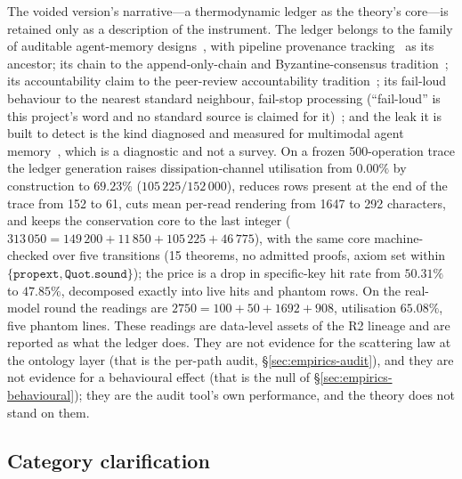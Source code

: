 \documentclass[11pt,a4paper]{article}
\begin{document}
The voided version's narrative---a thermodynamic ledger as the theory's core---is retained only as a description of the instrument. The ledger belongs to the family of auditable agent-memory designs~\cite{nian2026,ledger2026,echo2026,dieudonne2026,he2026beyond,he2026cognitive}, with pipeline provenance tracking~\cite{grafberger2023} as its ancestor; its chain to the append-only-chain and Byzantine-consensus tradition~\cite{garay2015,castro1999}; its accountability claim to the peer-review accountability tradition~\cite{haeberlen2007}; its fail-loud behaviour to the nearest standard neighbour, fail-stop processing (``fail-loud'' is this project's word and no standard source is claimed for it)~\cite{schneider1984}; and the leak it is built to detect is the kind diagnosed and measured for multimodal agent memory~\cite{memleak2026}, which is a diagnostic and not a survey. On a frozen 500-operation trace the ledger generation raises dissipation-channel utilisation from $0.00\%$ by construction to $69.23\%$ ($105\,225/152\,000$), reduces rows present at the end of the trace from 152 to 61, cuts mean per-read rendering from 1647 to 292 characters, and keeps the conservation core to the last integer ($313\,050 = 149\,200 + 11\,850 + 105\,225 + 46\,775$), with the same core machine-checked over five transitions (15 theorems, no admitted proofs, axiom set within $\{\texttt{propext}, \texttt{Quot.sound}\}$); the price is a drop in specific-key hit rate from $50.31\%$ to $47.85\%$, decomposed exactly into live hits and phantom rows. On the real-model round the readings are $2750 = 100 + 50 + 1692 + 908$, utilisation $65.08\%$, five phantom lines. These readings are data-level assets of the R2 lineage and are reported as what the ledger does. They are not evidence for the scattering law at the ontology layer (that is the per-path audit, \S\ref{sec:empirics-audit}), and they are not evidence for a behavioural effect (that is the null of \S\ref{sec:empirics-behavioural}); they are the audit tool's own performance, and the theory does not stand on them.

\subsection{Category clarification}
\label{sec:boundary-category}
\end{document}
